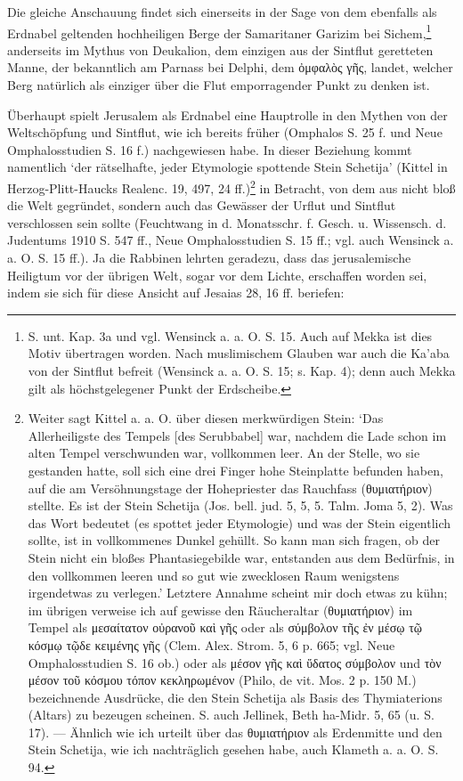 \documentclass[a4paper, 11pt, oneside]{article}
\begin{document}
Die gleiche Anschauung findet sich einerseits in der Sage von dem ebenfalls als Erdnabel geltenden hochheiligen Berge der Samaritaner Garizim bei Sichem,\footnote{S. unt. Kap. 3a und vgl. Wensinck a. a. O. S. 15. Auch auf Mekka ist dies Motiv übertragen worden. Nach muslimischem Glauben war auch die Ka'aba von der Sintflut befreit (Wensinck a. a. O. S. 15; s. Kap. 4); denn auch Mekka gilt als höchstgelegener Punkt der Erdscheibe.} anderseits im Mythus von Deukalion, dem einzigen aus der Sintflut geretteten Manne, der bekanntlich am Parnass bei Delphi, dem ὀμφαλὸς γῆς, landet, welcher Berg natürlich als einziger über die Flut emporragender Punkt zu denken ist.

Überhaupt spielt Jerusalem als Erdnabel eine Hauptrolle in den Mythen von der Weltschöpfung und Sintflut, wie ich bereits früher (Omphalos S. 25 f. und Neue Omphalosstudien S. 16 f.) nachgewiesen habe. In dieser Beziehung kommt namentlich `der rätselhafte, jeder Etymologie spottende Stein Schetija' (Kittel in Herzog-Plitt-Haucks Realenc. 19, 497, 24 ff.)\footnote{Weiter sagt Kittel a. a. O. über diesen merkwürdigen Stein: `Das Allerheiligste des Tempels [des Serubbabel] war, nachdem die Lade schon im alten Tempel verschwunden war, vollkommen leer. An der Stelle, wo sie gestanden hatte, soll sich eine drei Finger hohe Steinplatte befunden haben, auf die am Versöhnungstage der Hohepriester das Rauchfass (θυμιατήριον) stellte. Es ist der Stein Schetija (Jos. bell. jud. 5, 5, 5. Talm. Joma 5, 2). Was das Wort bedeutet (es spottet jeder Etymologie) und was der Stein eigentlich sollte, ist in vollkommenes Dunkel gehüllt. So kann man sich fragen, ob der Stein nicht ein bloßes Phantasiegebilde war, entstanden aus dem Bedürfnis, in den vollkommen leeren und so gut wie zwecklosen Raum wenigstens irgendetwas zu verlegen.' Letztere Annahme scheint mir doch etwas zu kühn; im übrigen verweise ich auf gewisse den Räucheraltar (θυμιατήριον) im Tempel als μεσαίτατον οὐρανοῦ καὶ γῆς oder als σύμβολον τῆς ἐν μέσῳ τῷ κόσμῳ τῷδε κειμένης γῆς (Clem. Alex. Strom. 5, 6 p. 665; vgl. Neue Omphalosstudien S. 16 ob.) oder als μέσον γῆς καὶ ὕδατος σύμβολον und τὸν μέσον τοῦ κόσμου τόπον κεκληρωμένον (Philo, de vit. Mos. 2 p. 150 M.) bezeichnende Ausdrücke, die den Stein Schetija als Basis des Thymiaterions (Altars) zu bezeugen scheinen. S. auch Jellinek, Beth ha-Midr. 5, 65 (u. S. 17). --- Ähnlich wie ich urteilt über das θυμιατήριον als Erdenmitte und den Stein Schetija, wie ich nachträglich gesehen habe, auch Klameth a. a. O. S. 94.} in Betracht, von dem aus nicht bloß die Welt gegründet, sondern auch das Gewässer der Urflut und Sintflut verschlossen sein sollte (Feuchtwang in d. Monatsschr. f. Gesch. u. Wissensch. d. Judentums 1910 S. 547 ff., Neue Omphalosstudien S. 15 ff.; vgl. auch Wensinck a. a. O. S. 15 ff.). Ja die Rabbinen lehrten geradezu, dass das jerusalemische Heiligtum vor der übrigen Welt, sogar vor dem Lichte, erschaffen worden sei, indem sie sich für diese Ansicht auf Jesaias 28, 16 ff. beriefen:
\end{document}
